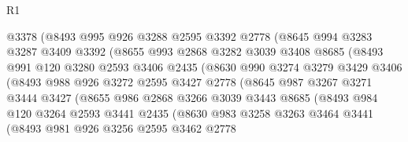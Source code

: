\begin{lexlean}{R1}
\begin{coremodule}
                  @3378
                  (@8493
                    @995
                    @926
                    @3288
                    @2595
                    @3392
                    @2778
                    (@8645
                      @994
                      @3283
                      @3287
                      @3409
                      @3392
                      (@8655
                        @993
                        @2868
                        @3282
                        @3039
                        @3408
                        @8685
                        (@8493
                          @991
                          @120
                          @3280
                          @2593
                          @3406
                          @2435
                          (@8630
                            @990
                            @3274
                            @3279
                            @3429
                            @3406
                            (@8493
                              @988
                              @926
                              @3272
                              @2595
                              @3427
                              @2778
                              (@8645
                                @987
                                @3267
                                @3271
                                @3444
                                @3427
                                (@8655
                                  @986
                                  @2868
                                  @3266
                                  @3039
                                  @3443
                                  @8685
                                  (@8493
                                    @984
                                    @120
                                    @3264
                                    @2593
                                    @3441
                                    @2435
                                    (@8630
                                      @983
                                      @3258
                                      @3263
                                      @3464
                                      @3441
                                      (@8493
                                        @981
                                        @926
                                        @3256
                                        @2595
                                        @3462
                                        @2778

\end{coremodule}
\end{lexlean}
